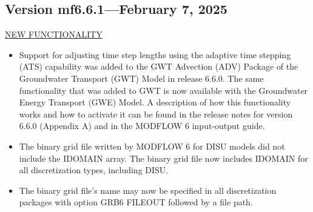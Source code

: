 	
\subsection{Version mf6.6.1---February 7, 2025}

\underline{NEW FUNCTIONALITY}
\begin{itemize}
	\item Support for adjusting time step lengths using the adaptive time stepping (ATS) capability was added to the GWT Advection (ADV) Package of the Groundwater Transport (GWT) Model in release 6.6.0.  The same functionality that was added to GWT is now available with the Groundwater Energy Transport (GWE) Model.  A description of how this functionality works and how to activate it can be found in the release notes for version 6.6.0 (Appendix A) and in the MODFLOW 6 input-output guide.
	\item The binary grid file written by MODFLOW 6 for DISU models did not include the IDOMAIN array.  The binary grid file now includes IDOMAIN for all discretization types, including DISU.
	\item The binary grid file's name may now be specified in all discretization packages with option GRB6 FILEOUT followed by a file path.
\end{itemize}


